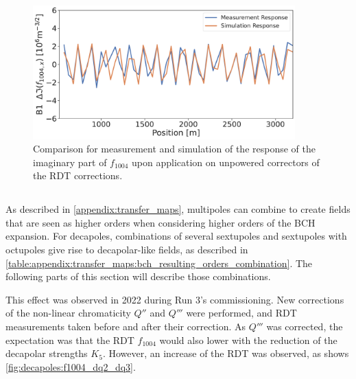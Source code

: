 \begin{figure}[!htb]
    \centering
    \includegraphics[width=0.9\textwidth]{./images/f1004/b1_response_rdt_corr.pdf}
    \caption{Comparison for measurement and simulation of the response of the imaginary part of
    $f_{1004}$ upon application on unpowered correctors of the RDT corrections.}
    \label{fig:decapoles:rdt:b1_response_corr}
\end{figure}



\subsection{}
\label{section:decapoles:feed_up}


\subsubsection{}

As described in \cref{appendix:transfer_maps}, multipoles can combine to create fields that are seen
as higher orders when considering higher orders of the BCH expansion.
For decapoles, combinations of several sextupoles and sextupoles with octupoles give rise to
decapolar-like fields, as described in
\cref{table:appendix:transfer_maps:bch_resulting_orders_combination}. The following parts of this
section will describe those combinations.

This effect was observed in 2022 during Run 3's commissioning. New corrections of the non-linear
chromaticity $Q''$ and $Q'''$ were performed, and RDT measurements taken before and after their
correction. As $Q'''$ was corrected, the expectation was that the RDT $f_{1004}$ would also lower
with the reduction of the decapolar strengths $K_5$. However, an increase of the RDT was observed,
as shows \cref{fig:decapoles:f1004_dq2_dq3}.

